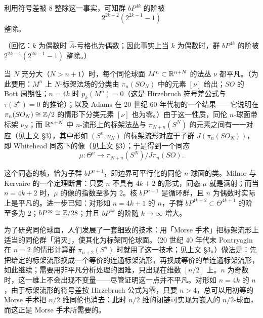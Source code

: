 利用符号差被 $8$ 整除这一事实，可知群 $bP^{4k}$ 的阶被
\[
2^{2k-2}(2^{2k-1}-1)
\]
整除。

（回忆：$k$ 为偶数时 $\hat A$-亏格也为偶数；因此事实上当 $k$ 为偶数时，群 $bP^{4k}$ 的阶被 $2^{2k-1}(2^{2k-1}-1)$ 整除。）

当 $N$ 充分大（$N>n+1$）时，每个同伦球面 $M^n\subset\mathbb{R}^{n+N}$ 的法丛 $\nu$ 都平凡。（为此要用：$M^n$ 上 $N$-标架法场的分类由 $\pi_n(SO_N)$ 中的元素 $[\nu]$ 给出；$SO$ 的 Bott 周期性；$n=4k$ 时 $p_k(M^n)=0$（这是 Hirzebruch 符号差公式与 $\tau(S^n)=0$ 的推论）；以及 Adams 在 20 世纪 60 年代初的一个结果——它说明在 $\pi_n(SO_N)\cong\mathbb{Z}/2$ 的情形下分类元素 $[\nu]$ 也为零。）由于这一性质，同伦 $n$-球面带标架 $\nu_N$；而 $\mathbb{R}^{n+N}$ 中 $n$-流形上的标架法丛与 $\pi_{N+n}(S^N)$ 的元素之间有一一对应（见上文 §3），其中形如 $(S^n,\nu_N)$ 的标架流形对应于子群 $J(\pi_n(SO_N))$，即 Whitehead 同态下的像（见上文 §3）；于是得到一个同态
\begin{equation}
\mu:\Theta^n\longrightarrow\pi_{N+n}(S^N)/J\pi_n(SO). \tag{4.5}
\end{equation}

这个同态的核，恰为子群 $bP^{n+1}$，即边界可平行化的同伦 $n$-球面的类。Milnor 与 Kervaire 的一个定理断言：只要 $n$ 不具有 $4k+2$ 的形式，同态 $\mu$ 就是满射；而当 $n=4k+2$ 时，$\mu$ 的像的指数至多为 $2$。核 $bP^{n+1}$ 是循环群，且 $n$ 为偶数时实际上是平凡的。进一步已知：对形如 $n=4k+1$ 的 $n$，子群 $bP^{4k+2}\subset\Theta^{4k+1}$ 的阶至多为 $2$；$bP^\infty\cong\mathbb{Z}/28$；并且 $bP^{4k}$ 的阶随 $k\to\infty$ 增大。

为了研究同伦球面，人们发展了一套细致的技术：用「Morse 手术」把标架流形上适当的同伦群「消灭」，使其化为标架同伦球面。（20 世纪 40 年代末 Pontryagin 在 $n=2$ 的情形计算群 $\pi_{n+2}(S^n)$ 时就用了这一技术；见上文 §3。）做法是：先把给定的标架流形换成一个等价的连通标架流形，再换成等价的单连通标架流形，如此继续；需要用非平凡分析处理的困难，只出现在维数 $[n/2]$ 上。$n$ 为奇数时，这一维上不会出现不变量——尽管证明这一点并不平凡。对形如 $n=4k$ 的 $n$，由于标架流形的符号差按 Hirzebruch 公式为零，只要 $n>4$，总可以用初等的 Morse 手术把 $n/2$ 维同伦也消去：此时 $n/2$ 维的闭链可实现为嵌入的 $n/2$-球面，而这正是 Morse 手术所需要的。

